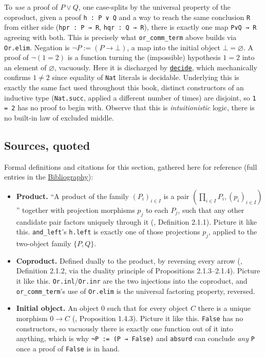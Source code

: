 To \emph{use} a proof of \(P \vee Q\), one case-splits by the universal property of the coproduct, given a proof \texttt{h : P ∨ Q} and a way to reach the same conclusion \texttt{R} from either side (\texttt{hpr : P → R}, \texttt{hqr : Q → R}), there is exactly one map \texttt{P∨Q → R} agreeing with both. This is precisely what \texttt{or\_\allowbreak{}comm\_\allowbreak{}term} above builds via \texttt{Or.elim}. Negation is \(\neg P := (P \to
\bot)\), a map into the initial object \(\bot = \varnothing\). A proof of \(\neg(1=2)\) is a function turning the (impossible) hypothesis \(1 = 2\) into an element of \(\varnothing\), vacuously. Here it is discharged by \href{https://lean-lang.org/doc/reference/latest/Tactic-Proofs/Tactic-Reference/}{\texttt{decide}}, which mechanically confirms \(1 \neq 2\) since equality of \texttt{Nat} literals is decidable. Underlying this is exactly the same fact used throughout this book, distinct constructors of an inductive type (\texttt{Nat.succ}, applied a different number of times) are disjoint, so \texttt{1 = 2} has no proof to begin with. Observe that this is \emph{intuitionistic} logic, there is no built-in law of excluded middle.

\subsection{Sources, quoted}\label{sec:04-propositions-and-proofs:05-and-or-not:2}

Formal definitions and citations for this section, gathered here for reference (full entries in the \hyperref[sec:root:bibliography:1]{Bibliography}):

\begin{itemize}
\tightlist
\item
  \textbf{Product.} ``A product of the family \((P_i)_{i \in I}\) is a pair \(\left(\prod_{i \in I} P_i, (p_i)_{i \in I}\right)\)'' together with projection morphisms \(p_j\) to each \(P_j\), such that any other candidate pair factors uniquely through it (\cite{Agore2023}, Definition 2.1.1). Picture it like this. \texttt{and\_\allowbreak{}left}'s \texttt{h.left} is exactly one of those projections \(p_j\), applied to the two-object family \(\{P, Q\}\).
\item
  \textbf{Coproduct.} Defined dually to the product, by reversing every arrow (\cite{Agore2023}, Definition 2.1.2, via the duality principle of Propositions 2.1.3--2.1.4). Picture it like this. \texttt{Or.inl}/\texttt{Or.inr} are the two injections into the coproduct, and \texttt{or\_\allowbreak{}comm\_\allowbreak{}term}'s use of \texttt{Or.elim} is the universal factoring property, reversed.
\item
  \textbf{Initial object.} An object \(0\) such that for every object \(C\) there is a unique morphism \(0 \to C\) (\cite{Agore2023}, Proposition 1.4.3). Picture it like this. \texttt{False} has no constructors, so vacuously there is exactly one function out of it into anything, which is why \texttt{¬P := (P → False)} and \texttt{absurd} can conclude \emph{any} \texttt{P} once a proof of \texttt{False} is in hand.
\end{itemize}
